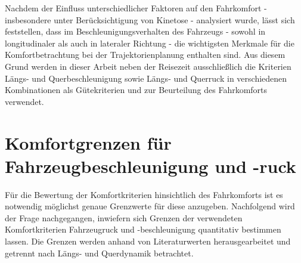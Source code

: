 Nachdem der Einfluss unterschiedlicher Faktoren auf den Fahrkomfort - insbesondere unter Berücksichtigung von Kinetose - analysiert wurde, lässt sich feststellen, dass im Beschleunigungsverhalten des Fahrzeugs - sowohl in longitudinaler als auch in lateraler Richtung - die wichtigsten Merkmale für die Komfortbetrachtung bei der Trajektorienplanung enthalten sind. Aus diesem Grund werden in dieser Arbeit neben der Reisezeit ausschließlich die Kriterien Längs- und Querbeschleunigung sowie Längs- und Querruck in verschiedenen Kombinationen als Gütekriterien und zur Beurteilung des Fahrkomforts verwendet. 

\section{Komfortgrenzen für Fahrzeugbeschleunigung und -ruck} \label{sec:komfortgrenzen}
Für die Bewertung der Komfortkriterien hinsichtlich des Fahrkomforts ist es notwendig möglichst genaue Grenzwerte für diese anzugeben. Nachfolgend wird der Frage nachgegangen, inwiefern sich Grenzen der verwendeten Komfortkriterien Fahrzeugruck und -beschleunigung quantitativ bestimmen lassen. Die Grenzen werden anhand von Literaturwerten herausgearbeitet und getrennt nach Längs- und Querdynamik betrachtet.

